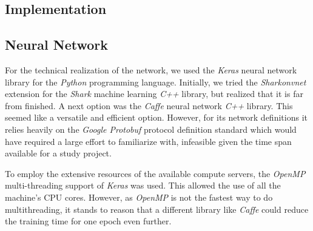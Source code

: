 \documentclass[11pt, a4paper]{article}
\begin{document}
\begin{appendix}
	\section{Implementation}
	
	\subsection{Neural Network}
	For the technical realization of the network, we used the \emph{Keras} neural network library for the \emph{Python} programming language. Initially, we tried the \emph{Sharkonvnet} extension for the \emph{Shark} machine learning \emph{C++} library, but realized that it is far from finished. A next option was the \emph{Caffe} neural network \emph{C++} library. This seemed like a versatile and efficient option. However, for its network definitions it relies heavily on the \emph{Google Protobuf} protocol definition standard which would have required a large effort to familiarize with, infeasible given the time span available for a study project.
	
	To employ the extensive resources of the available compute servers, the \emph{OpenMP} multi-threading support of \emph{Keras} was used. This allowed the use of all the machine's CPU cores. However, as \emph{OpenMP} is not the fastest way to do multithreading, it stands to reason that a different library like \emph{Caffe} could reduce the training time for one epoch even further.
	

\end{appendix}
\end{document}
